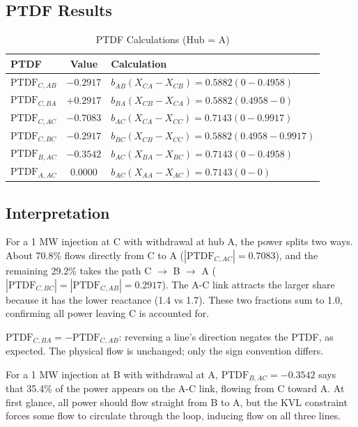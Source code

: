 \documentclass[journal, onecolumn, 12pt]{IEEEtran}
\begin{document}
\subsection{PTDF Results}

\begin{table}[h]
    \centering
    \caption{PTDF Calculations (Hub = A)}
    \label{tab:ptdfs}
    \begin{tabular}{@{}lcl@{}}
    \toprule
    \textbf{PTDF} & \textbf{Value} & \textbf{Calculation} \\ \midrule
    $\text{PTDF}_{C,AB}$ & $-0.2917$ & $b_{AB}(X_{CA} - X_{CB}) = 0.5882(0 - 0.4958)$ \\
    $\text{PTDF}_{C,BA}$ & $+0.2917$ & $b_{BA}(X_{CB} - X_{CA}) = 0.5882(0.4958 - 0)$ \\
    $\text{PTDF}_{C,AC}$ & $-0.7083$ & $b_{AC}(X_{CA} - X_{CC}) = 0.7143(0 - 0.9917)$ \\
    $\text{PTDF}_{C,BC}$ & $-0.2917$ & $b_{BC}(X_{CB} - X_{CC}) = 0.5882(0.4958 - 0.9917)$ \\
    $\text{PTDF}_{B,AC}$ & $-0.3542$ & $b_{AC}(X_{BA} - X_{BC}) = 0.7143(0 - 0.4958)$ \\
    $\text{PTDF}_{A,AC}$ & $0.0000$ & $b_{AC}(X_{AA} - X_{AC}) = 0.7143(0 - 0)$ \\
    \bottomrule
    \end{tabular}
\end{table}

\subsection{Interpretation}

For a 1 MW injection at C with withdrawal at hub A, the power splits two ways. About 70.8\% flows directly from C to A ($|\text{PTDF}_{C,AC}| = 0.7083$), and the remaining 29.2\% takes the path C $\to$ B $\to$ A ($|\text{PTDF}_{C,BC}| = |\text{PTDF}_{C,AB}| = 0.2917$). The A-C link attracts the larger share because it has the lower reactance (1.4 vs 1.7). These two fractions sum to 1.0, confirming all power leaving C is accounted for. \par

$\text{PTDF}_{C,BA} = -\text{PTDF}_{C,AB}$: reversing a line's direction negates the PTDF, as expected. The physical flow is unchanged; only the sign convention differs. \par

For a 1 MW injection at B with withdrawal at A, $\text{PTDF}_{B,AC} = -0.3542$ says that 35.4\% of the power appears on the A-C link, flowing from C toward A. At first glance, all power should flow straight from B to A, but the KVL constraint forces some flow to circulate through the loop, inducing flow on all three lines. \par
\end{document}
